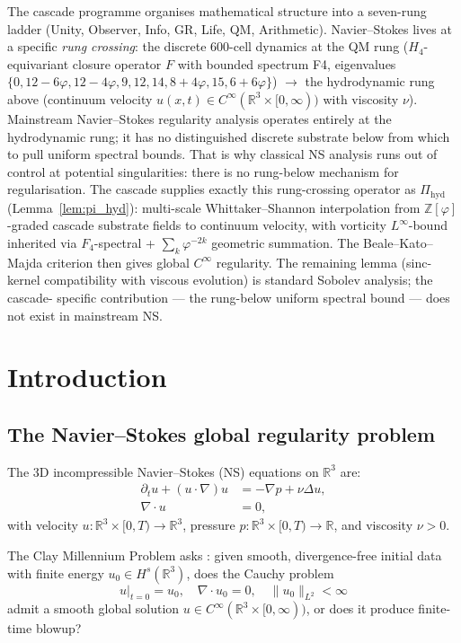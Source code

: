 \documentclass[11pt, a4paper]{amsart}
\theoremstyle{definition}
\newcommand{\R}{\mathbb{R}}
\begin{document}
The cascade programme organises mathematical structure into a
seven-rung ladder (Unity, Observer, Info, GR, Life, QM,
Arithmetic). Navier--Stokes lives at a specific \emph{rung
crossing}: the discrete 600-cell dynamics at the QM rung
($H_4$-equivariant closure operator $F$ with bounded spectrum F4,
eigenvalues $\{0, 12-6\varphi, 12-4\varphi, 9, 12, 14, 8+4\varphi, 15,
6+6\varphi\}$) $\to$ the hydrodynamic rung above (continuum
velocity $u(x,t) \in C^\infty(\R^3 \times [0, \infty))$ with
viscosity $\nu$). Mainstream Navier--Stokes regularity analysis
operates entirely at the hydrodynamic rung; it has no distinguished
discrete substrate below from which to pull uniform spectral
bounds. That is why classical NS analysis runs out of control at
potential singularities: there is no rung-below mechanism for
regularisation. The cascade supplies exactly this rung-crossing
operator as $\Pi_{\mathrm{hyd}}$ (Lemma~\ref{lem:pi_hyd}):
multi-scale Whittaker--Shannon interpolation from
$\mathbb{Z}[\varphi]$-graded cascade substrate fields to continuum
velocity, with vorticity $L^\infty$-bound inherited via
$F_4$-spectral + $\sum_k \varphi^{-2k}$ geometric summation. The
Beale--Kato--Majda criterion then gives global $C^\infty$
regularity. The remaining lemma (sinc-kernel compatibility with
viscous evolution) is standard Sobolev analysis; the cascade-
specific contribution — the rung-below uniform spectral bound —
does not exist in mainstream NS.

\section{Introduction}

\subsection{The Navier--Stokes global regularity problem}

The 3D incompressible Navier--Stokes (NS) equations on $\R^3$ are:
\begin{align}
\partial_t u + (u \cdot \nabla) u &= -\nabla p + \nu \Delta u, \label{eq:NS1} \\
\nabla \cdot u &= 0, \label{eq:NS2}
\end{align}
with velocity $u: \R^3 \times [0, T) \to \R^3$, pressure
$p: \R^3 \times [0, T) \to \R$, and viscosity $\nu > 0$.

The Clay Millennium Problem asks \cite{Fefferman2000}: given smooth,
divergence-free initial data with finite energy $u_0 \in H^s(\R^3)$,
does the Cauchy problem
\[
u|_{t=0} = u_0, \quad \nabla \cdot u_0 = 0, \quad \|u_0\|_{L^2} < \infty
\]
admit a smooth global solution $u \in C^\infty(\R^3 \times [0, \infty))$,
or does it produce finite-time blowup?
\end{document}
